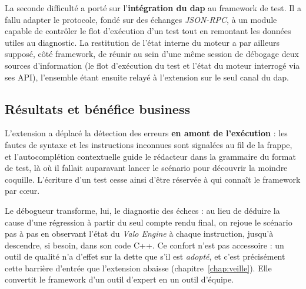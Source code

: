 La seconde difficulté a porté sur l'\textbf{intégration du \gls{dap}} au
framework de test. Il a fallu adapter le protocole, fondé sur des échanges
\emph{JSON-RPC}, à un module capable de contrôler le flot d'exécution d'un test
tout en remontant les données utiles au diagnostic. La restitution de l'état
interne du moteur a par ailleurs supposé, côté framework, de réunir au sein
d'une même session de débogage deux sources d'information (le flot
d'exécution du test et l'état du moteur interrogé via ses API), l'ensemble
étant ensuite relayé à l'extension sur le seul canal du \gls{dap}.

\subsection{Résultats et bénéfice business}
L'extension a déplacé la détection des erreurs \textbf{en amont de
l'exécution} : les fautes de syntaxe et les instructions inconnues sont
signalées au fil de la frappe, et l'autocomplétion contextuelle guide le
rédacteur dans la grammaire du format de test, là où il fallait auparavant
lancer le scénario pour découvrir la moindre coquille. L'écriture d'un test
cesse ainsi d'être réservée à qui connaît le framework par cœur.

Le débogueur transforme, lui, le diagnostic des échecs : au lieu de déduire
la cause d'une régression à partir du seul compte rendu final, on rejoue le
scénario pas à pas en observant l'état du \emph{Valo Engine} à chaque
instruction, jusqu'à descendre, si besoin, dans son code C++. Ce confort
n'est pas accessoire : un outil de qualité n'a d'effet sur la dette que s'il
est \emph{adopté}, et c'est précisément cette barrière d'entrée que
l'extension abaisse (chapitre~\ref{chap:veille}). Elle convertit le framework
d'un outil d'expert en un outil d'équipe.
